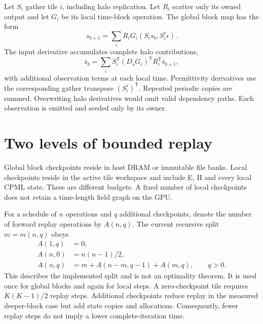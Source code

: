 \documentclass[11pt,a4paper]{article}
\begin{document}
Let $S_i$ gather tile $i$, including halo replication. Let $R_i$ scatter only
its owned output and let $G_i$ be its local time-block operation. The global
block map has the form
\begin{equation}
 s_{b+1}=\sum_i R_i G_i(S_i s_b,S_i^\epsilon\epsilon).
\end{equation}
The input derivative accumulates complete halo contributions,
\begin{equation}
 \bar s_b=\sum_i S_i^{\mathsf T}
 (D_sG_i)^{\mathsf T}R_i^{\mathsf T}\bar s_{b+1},
\end{equation}
with additional observation terms at each local time. Permittivity derivatives
use the corresponding gather transpose $(S_i^\epsilon)^{\mathsf T}$. Repeated
periodic copies are summed. Overwriting halo derivatives would omit valid
dependency paths. Each observation is emitted and seeded only by its owner.

\section{Two levels of bounded replay}
Global block checkpoints reside in host DRAM or immutable file banks. Local checkpoints reside in the
active tile workspace and include E, H and every local CPML state. These are
different budgets. A fixed number of local checkpoints does not retain a
time-length field graph on the GPU.

For a schedule of $n$ operations and $q$ additional checkpoints, denote the
number of forward replay operations by $A(n,q)$. The current recursive split
$m=m(n,q)$ obeys
\begin{align}
 A(1,q)&=0,\\
 A(n,0)&=n(n-1)/2,\\
 A(n,q)&=m+A(n-m,q-1)+A(m,q),\qquad q>0.
\end{align}
This describes the implemented split and is not an optimality theorem. It is
used once for global blocks and again for local steps. A zero-checkpoint tile
requires $K(K-1)/2$ replay steps. Additional checkpoints reduce replay in the
measured deeper-block case but add state copies and allocations. Consequently,
fewer replay steps do not imply a lower complete-iteration time.
\end{document}
